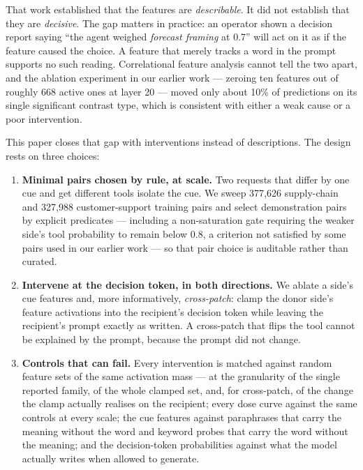 \documentclass{article}
\begin{document}
That work established that the features are \emph{describable}. It did not establish that they are \emph{decisive}. The gap matters in practice: an operator shown a decision report saying ``the agent weighed \emph{forecast framing} at 0.7'' will act on it as if the feature caused the choice. A feature that merely tracks a word in the prompt supports no such reading. Correlational feature analysis cannot tell the two apart, and the ablation experiment in our earlier work --- zeroing ten features out of roughly 668 active ones at layer 20 --- moved only about 10\% of predictions on its single significant contrast type, which is consistent with either a weak cause or a poor intervention.

This paper closes that gap with interventions instead of descriptions. The design rests on three choices:

\begin{enumerate}
\item \textbf{Minimal pairs chosen by rule, at scale.} Two requests that differ by one cue and get different tools isolate the cue. We sweep 377{,}626 supply-chain and 327{,}988 customer-support training pairs and select demonstration pairs by explicit predicates --- including a non-saturation gate requiring the weaker side's tool probability to remain below 0.8, a criterion not satisfied by some pairs used in our earlier work --- so that pair choice is auditable rather than curated.
\item \textbf{Intervene at the decision token, in both directions.} We ablate a side's cue features and, more informatively, \emph{cross-patch}: clamp the donor side's feature activations into the recipient's decision token while leaving the recipient's prompt exactly as written. A cross-patch that flips the tool cannot be explained by the prompt, because the prompt did not change.
\item \textbf{Controls that can fail.} Every intervention is matched against random feature sets of the same activation mass --- at the granularity of the single reported family, of the whole clamped set, and, for cross-patch, of the change the clamp actually realises on the recipient; every dose curve against the same controls at every scale; the cue features against paraphrases that carry the meaning without the word and keyword probes that carry the word without the meaning; and the decision-token probabilities against what the model actually writes when allowed to generate.
\end{enumerate}
\end{document}
